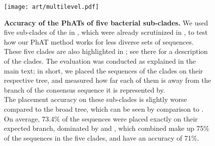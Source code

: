 
\begin{figure}[hpbt]
    \centering
    \texttt{[image: art/multilevel.pdf]}
    \begin{subfigure}{0pt}
        \label{fig:multilevel:sub:edge_unconstr}
    \end{subfigure}
    \begin{subfigure}{0pt}
        \label{fig:multilevel:sub:edge_constr}
    \end{subfigure}
    \begin{subfigure}{0pt}
        \label{fig:multilevel:sub:branch_unconstr}
    \end{subfigure}
    \begin{subfigure}{0pt}
        \label{fig:multilevel:sub:branch_constr}
    \end{subfigure}
    \caption[Accuracy of the \acp{PhAT} of five bacterial sub-clades]{
        \textbf{Accuracy of the \acp{PhAT} of five bacterial sub-clades.}
        We used five sub-clades of the  in ,
        which were already scrutinized in \citep{Kozlov2016},
        to test how our \ac{PhAT} method works for less diverse sets of sequences.
        These five clades are also highlighted in ;
        see there for a description of the clades.
        The evaluation was conducted as explained in the main text;
        in short, we placed the  sequences of the clades on their respective tree,
        and measured how far each of them is away from the branch of the consensus sequence it is represented by.
        \\
        The placement accuracy on these sub-clades is slightly worse compared to the broad  tree,
        which can be seen by comparison to .
        On average, 73.4\% of the sequences were placed exactly on their expected branch,
        dominated by  and ,
        which combined make up 75\% of the sequences in the five clades, and have an accuracy of 71\%.
}
\end{figure}
